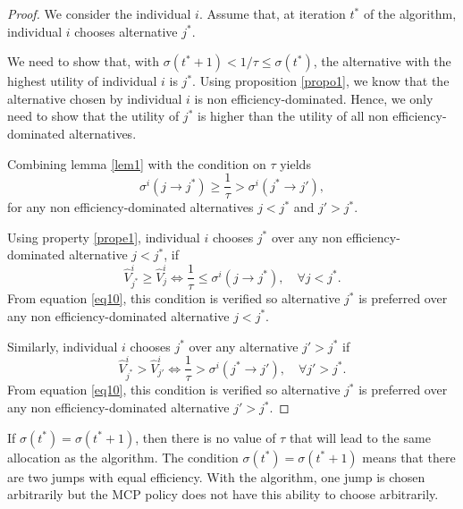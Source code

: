 \documentclass[empty, english]{javaudin}
\begin{document}
\begin{proof}
	We consider the individual $i$. 
	Assume that, at iteration $t^{*}$ of the algorithm, individual $i$ chooses alternative $j^{*}$.

	We need to show that, with $\sigma(t^{*}+1) < 1 / \tau \leq \sigma(t^{*})$, the alternative with the highest utility of individual $i$ is $j^{*}$.
	Using proposition \ref{propo1}, we know that the alternative chosen by individual $i$ is non efficiency-dominated.
	Hence, we only need to show that the utility of $j^{*}$ is higher than the utility of all non efficiency-dominated alternatives.

	Combining lemma \ref{lem1} with the condition on $\tau$ yields
	\begin{equation}
		\sigma^i(j \rightarrow j^{*}) \geq \frac{1}{\tau} > \sigma^i(j^{*} \rightarrow j'),
		\label{eq10}
	\end{equation}
	for any non efficiency-dominated alternatives $j< j^{*}$ and $j' > j^{*}$.

	Using property \ref{prope1}, individual $i$ chooses $j^{*}$ over any non efficiency-dominated alternative $j < j^{*}$, if
\begin{equation}
	\hat{V}_{j^{*}}^i \geq \hat{V}_{j}^i \Leftrightarrow \frac{1}{\tau} \leq \sigma^i(j \rightarrow j^{*}), \quad \forall j < j^{*}.
\end{equation}
From equation \eqref{eq10}, this condition is verified so alternative $j^{*}$ is preferred over any non efficiency-dominated alternative $j < j^{*}$.

Similarly, individual $i$ chooses $j^{*}$ over any alternative $j' > j^{*}$ if
\begin{equation}
	\hat{V}_{j^{*}}^i > \hat{V}_{j'}^i \Leftrightarrow \frac{1}{\tau} > \sigma^i(j^{*} \rightarrow j'), \quad \forall j' > j^{*}.
\end{equation}
From equation \eqref{eq10}, this condition is verified so alternative $j^{*}$ is preferred over any non efficiency-dominated alternative $j' > j^{*}$.

\end{proof}

If $\sigma(t^{*}) = \sigma(t^{*} + 1)$, then there is no value of $\tau$ that will lead to the same allocation as the algorithm.
The condition $\sigma(t^{*}) = \sigma(t^{*} + 1)$ means that there are two jumps with equal efficiency.
With the algorithm, one jump is chosen arbitrarily but the MCP policy does not have this ability to choose arbitrarily.
\end{document}
